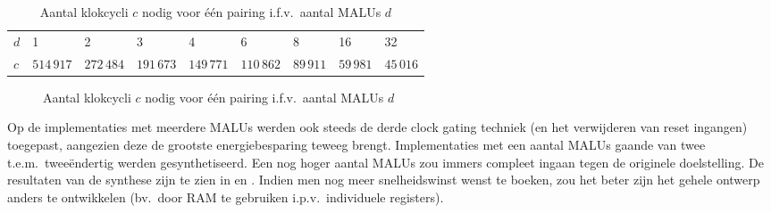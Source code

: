 \begin{table}[h]
	\caption{Aantal klokcycli $c$ nodig voor \'e\'en pairing i.f.v.\ aantal MALUs $d$}
	\label{tabel-resultaten-multi-cycles}

	\begin{narrow}{-1cm}{-1cm}
		\centering
		\begin{tabular}{lllllllll}
			\toprule
			$d$	& 1	& 2	& 3	& 4	& 6	& 8	& 16	& 32\\
			$c$	& $514\,917$	& $272\,484$	& $191\,673$	& $149\,771$	& $110\,862$	& $89\,911$	& $59\,981$	& $45\,016$\\
			\bottomrule	
		\end{tabular}
	\end{narrow}
\end{table}

\begin{figure}[h]
	\centering
		\caption{Aantal klokcycli $c$ nodig voor \'e\'en pairing i.f.v.\ aantal MALUs $d$\label{figuur-resultaten-multi-cycles}}
\end{figure}

Op de implementaties met meerdere MALUs werden ook steeds de derde clock gating techniek (en het verwijderen van reset ingangen) toegepast, aangezien deze de grootste energiebesparing teweeg brengt. Implementaties met een aantal MALUs gaande van twee t.e.m.\ twee\"endertig werden gesynthetiseerd. Een nog hoger aantal MALUs zou immers compleet ingaan tegen de originele doelstelling. De resultaten van de synthese zijn te zien in  en . Indien men nog meer snelheidswinst wenst te boeken, zou het beter zijn het gehele ontwerp anders te ontwikkelen (bv.\ door RAM te gebruiken i.p.v.\ individuele registers).

